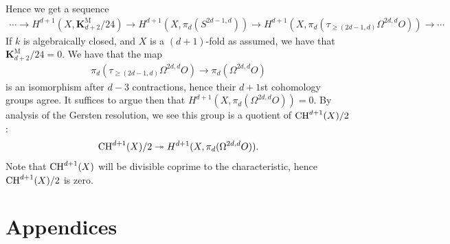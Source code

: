 \documentclass[11pt,openany]{book}
\providecommand{\KM}{\mathbf{K}^\mathrm{M}}
\begin{document}
Hence we get a sequence
\begin{align*}
    \cdots \to H^{d+1}(X,\KM_{d+2}/24) \to H^{d+1}(X, \pi_d(S^{2d-1,d})) \to H^{d+1}(X, \pi_d(\tau_{\ge(2d-1,d)}\Omega^{2d,d}O)) \to \cdots 
\end{align*}
If $k$ is algebraically closed, and $X$ is a $(d+1)$-fold as assumed, we have that $\KM_{d+2}/24 = 0$. We have that the map
\begin{align*}
    \pi_d(\tau_{\ge(2d-1,d)}\Omega^{2d,d}O) \to \pi_d(\Omega^{2d,d}O)
\end{align*}
is an isomorphism after $d-3$ contractions, hence their $d+1$st cohomology groups agree. It suffices to argue then that $H^{d+1}(X,\pi_d(\Omega^{2d,d}O)) = 0$. By analysis of the Gersten resolution, we see this group is a quotient of $\mathrm{CH}^{d+1}(X)/2$:
\begin{align*}
    \mathrm{CH}^{d+1}(X)/2 \twoheadrightarrow H^{d+1}(X, \pi_d(\Omega^{2d,d}O)).
\end{align*}
Note that $\mathrm{CH}^{d+1}(X)$ will be divisible coprime to the characteristic, hence $\mathrm{CH}^{d+1}(X)/2$ is zero.


\chapter{Appendices}




\printbibliography
\end{document}
